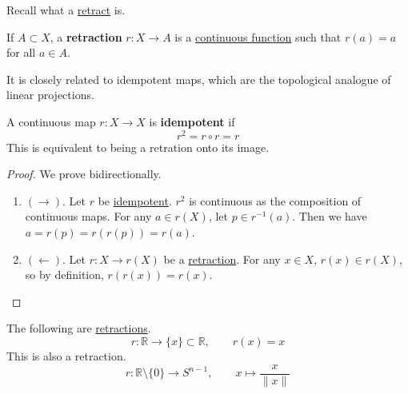 	Recall what a \hyperref[pst-def:retraction]{retract} is. 

  \begin{definition}[Retraction]
    \label{def:retraction}
		If $A \subset X$, a \textbf{retraction} $r: X \to A$ is a \hyperref[pst-def:continuous_func]{continuous function} such that $r(a) = a$ for all $a \in A$.  
  \end{definition}

	It is closely related to idempotent maps, which are the topological analogue of linear projections. 

	\begin{definition}[Idempotent]
	  \label{def:idempotent}
	  A continuous map $r: X \to X$ is \textbf{idempotent} if 
		\begin{equation}
		  r^2 = r \circ r = r
		\end{equation} 
		This is equivalent to being a retration onto its image. 
	\end{definition}
	\begin{proof}
	  We prove bidirectionally. 
		\begin{enumerate}
			\item $(\rightarrow)$. Let $r$ be \hyperref[def:idempotent]{idempotent}. $r^2$ is continuous as the composition of continuous maps. For any $a \in r(X)$, let $p \in r^{-1} (a)$. Then we have $a = r(p) = r(r(p)) = r(a)$. 
			\item $(\leftarrow)$. Let $r: X \to r(X)$ be a \hyperref[def:retraction]{retraction}. For any $x \in X$, $r(x) \in r(X)$, so by definition, $r(r(x)) = r(x)$. 
		\end{enumerate}
	\end{proof}

	\begin{example}[Retracts]
	  \label{ex:retracts}
    The following are \hyperref[def:retraction]{retractions}. 
    \begin{equation}
      r: \mathbb{R} \to \{x\} \subset \mathbb{R}, \qquad r(x) = x
    \end{equation}
    This is also a retraction. 
    \begin{equation}
      r: \mathbb{R} \setminus \{0\} \to S^{n-1}, \qquad x \mapsto \frac{x}{\|x\|} 
    \end{equation}
  \end{example}


